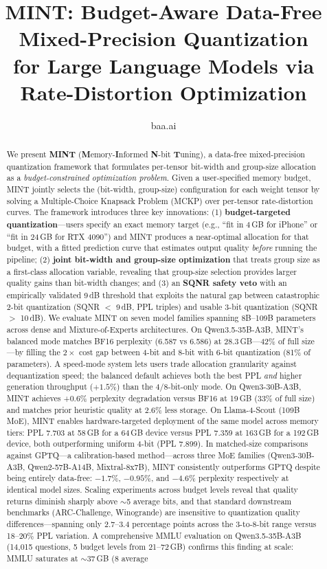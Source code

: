 \documentclass{article}
\title{MINT: Budget-Aware Data-Free Mixed-Precision Quantization\\for Large Language Models via Rate-Distortion Optimization}
\author{
  baa.ai
}
\begin{document}
\maketitle

\begin{abstract}
We present \textbf{MINT} (\textbf{M}emory-\textbf{I}nformed \textbf{N}-bit \textbf{T}uning), a data-free mixed-precision quantization framework that formulates per-tensor bit-width and group-size allocation as a \emph{budget-constrained optimization problem}. Given a user-specified memory budget, MINT jointly selects the (bit-width, group-size) configuration for each weight tensor by solving a Multiple-Choice Knapsack Problem (MCKP) over per-tensor rate-distortion curves. The framework introduces three key innovations: (1) \textbf{budget-targeted quantization}---users specify an exact memory target (e.g., ``fit in 4\,GB for iPhone'' or ``fit in 24\,GB for RTX 4090'') and MINT produces a near-optimal allocation for that budget, with a fitted prediction curve that estimates output quality \emph{before} running the pipeline; (2) \textbf{joint bit-width and group-size optimization} that treats group size as a first-class allocation variable, revealing that group-size selection provides larger quality gains than bit-width changes; and (3) an \textbf{SQNR safety veto} with an empirically validated 9\,dB threshold that exploits the natural gap between catastrophic 2-bit quantization (SQNR $<$ 9\,dB, PPL triples) and usable 3-bit quantization (SQNR $>$ 10\,dB). We evaluate MINT on seven model families spanning 8B--109B parameters across dense and Mixture-of-Experts architectures. On Qwen3.5-35B-A3B, MINT's balanced mode matches BF16 perplexity (6.587 vs 6.586) at 28.3\,GB---42\% of full size---by filling the $2\times$ cost gap between 4-bit and 8-bit with 6-bit quantization (81\% of parameters). A speed-mode system lets users trade allocation granularity against dequantization speed; the balanced default achieves both the best PPL \emph{and} higher generation throughput ($+1.5\%$) than the 4/8-bit-only mode. On Qwen3-30B-A3B, MINT achieves +0.6\% perplexity degradation versus BF16 at 19\,GB (33\% of full size) and matches prior heuristic quality at 2.6\% less storage. On Llama-4-Scout (109B MoE), MINT enables hardware-targeted deployment of the same model across memory tiers: PPL 7.703 at 58\,GB for a 64\,GB device versus PPL 7.359 at 163\,GB for a 192\,GB device, both outperforming uniform 4-bit (PPL 7.899). In matched-size comparisons against GPTQ---a calibration-based method---across three MoE families (Qwen3-30B-A3B, Qwen2-57B-A14B, Mixtral-8x7B), MINT consistently outperforms GPTQ despite being entirely data-free: $-1.7\%$, $-0.95\%$, and $-4.6\%$ perplexity respectively at identical model sizes. Scaling experiments across budget levels reveal that quality returns diminish sharply above ${\sim}$5 average bits, and that standard downstream benchmarks (ARC-Challenge, Winogrande) are insensitive to quantization quality differences---spanning only 2.7--3.4 percentage points across the 3-to-8-bit range versus 18--20\% PPL variation. A comprehensive MMLU evaluation on Qwen3.5-35B-A3B (14{,}015 questions, 5 budget levels from 21--72\,GB) confirms this finding at scale: MMLU saturates at ${\sim}$37\,GB (8 average 
\end{abstract}
\end{document}
